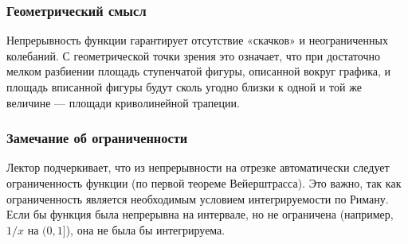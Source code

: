 \subsubsection*{Геометрический смысл}
Непрерывность функции гарантирует отсутствие «скачков» и неограниченных колебаний. С геометрической точки зрения это означает, что при достаточно мелком разбиении площадь ступенчатой фигуры, описанной вокруг графика, и площадь вписанной фигуры будут сколь угодно близки к одной и той же величине — площади криволинейной трапеции.

\subsubsection*{Замечание об ограниченности}
Лектор подчеркивает, что из непрерывности на отрезке автоматически следует ограниченность функции (по первой теореме Вейерштрасса). Это важно, так как ограниченность является необходимым условием интегрируемости по Риману. Если бы функция была непрерывна на интервале, но не ограничена (например, $1/x$ на $(0, 1]$), она не была бы интегрируема.



